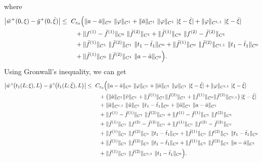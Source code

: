 \documentclass[a4paper,reqno,11pt]{amsart}
\numberwithin{equation}{section} %
\begin{document}
where
\[
\begin{aligned}
\bigl|\tilde w^+(0,\xi)-\tilde y ^+(0,\bar\xi)\bigr|
\le{}&\ C_{\varepsilon_0}\Bigl(
  \|a-\bar a\|_{C^{0}}\ \|\varphi\|_{C^{1}}
  + \|\bar a\|_{C^{1}}\ \|\varphi\|_{C^{1}}\ |\xi-\bar\xi|
  + \|\varphi\|_{C^{1,1}}\ |\xi-\bar\xi| \\
&\quad + \|f^{(1)}-\bar f^{(1)}\|_{C^{0}}\ \|\bar f^{(2)}\|_{C^{1}}
  + \|\bar f^{(1)}\|_{C^{0}}\ \|f^{(2)}-\bar f^{(2)}\|_{C^{1}} \\
&\quad + \|\bar f^{(1)}\|_{C^{1}}\ \|\bar f^{(2)}\|_{C^{1}}\ \|t_1-\bar t_1\|_{C^{0}}
  + \|\bar f^{(1)}\|_{C^{0}}\ \|\bar f^{(2)}\|_{C^{1,1}}\ \|t_1-\bar t_1\|_{C^{0}} \\
&\quad + \|\bar f^{(1)}\|_{C^{0}}\ \|\bar f^{(2)}\|_{C^{1}}\ \|a-\bar a\|_{C^{0}}
\Bigr).
\end{aligned}
\]
Using Gronwall's inequality, we can get
\[
\begin{aligned}
\bigl|\tilde w^+\!\bigl(t_1(L;\xi),L\bigr)-\tilde y ^+\!\bigl(\bar t_1(L;\bar\xi),L\bigr)\bigr|
\le{}&\ C_{\varepsilon_0}\Bigl(
  \|a-\bar a\|_{C^{0}}\ \|\varphi\|_{C^{1}}
  + \|\bar a\|_{C^{1}}\ \|\varphi\|_{C^{1}}\ |\xi-\bar\xi|
  + \|\varphi\|_{C^{1,1}}\ |\xi-\bar\xi|
\\
&\quad
  + \bigl(\|\tilde a\|_{C^{1}}\|\tilde v\|_{C^{1}}
     + \|\bar f^{(1)}\|_{C^{1}}\|\bar f^{(2)}\|_{C^{1}}
     + \|\bar f^{(1)}\|_{C^{0}}\|\bar f^{(2)}\|_{C^{1,1}}\bigr)\,|\xi-\bar\xi|
\\
&\quad
  + \|\tilde a\|_{C^{1,1}}\ \|\tilde u\|_{C^{1}}\ \|t_1-\bar t_1\|_{C^{0}}
  + \|\tilde u\|_{C^{1}}\ \|a-\bar a\|_{C^{1}}
\\
&\quad
  + \|f^{(1)}-\bar f^{(1)}\|_{C^{1}}\ \|\bar f^{(2)}\|_{C^{1}}
  + \|f^{(1)}-\bar f^{(1)}\|_{C^{1}}\ \|f^{(2)}\|_{C^{1}}
\\
&\quad
  + \|\bar f^{(1)}\|_{C^{1}}\ \|f^{(2)}-\bar f^{(2)}\|_{C^{1}}
  + \|f^{(1)}\|_{C^{1}}\ \|f^{(2)}-\bar f^{(2)}\|_{C^{1}}
\\
&\quad
  + \|f^{(1)}\|_{C^{1}}\ \|f^{(2)}\|_{C^{1}}\ \|t_1-\bar t_1\|_{C^{0}}
  + \|\bar f^{(1)}\|_{C^{1}}\ \|f^{(2)}\|_{C^{1}}\ \|t_1-\bar t_1\|_{C^{0}}
\\
&\quad
  + \|\bar f^{(1)}\|_{C^{1}}\ \|\bar f^{(2)}\|_{C^{1}}\ \|t_1-\bar t_1\|_{C^{0}}
  + \|\bar f^{(1)}\|_{C^{1}}\ \|\bar f^{(2)}\|_{C^{1}}\ \|a-\bar a\|_{C^{1}}
\\
&\quad
  + \|\bar f^{(1)}\|_{C^{1}}\ \|\bar f^{(2)}\|_{C^{1,1}}\ \|t_1-\bar t_1\|_{C^{0}}
\Bigr).
\end{aligned}
\]
\end{document}
